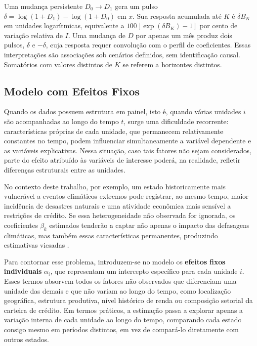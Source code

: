 Uma mudança persistente $D_0\to D_1$ gera um pulso $\delta=\log(1+D_1)-\log(1+D_0)$ em $x$. Sua resposta acumulada até $K$ é $\delta B_K$ em unidades logarítmicas, equivalente a $100[\exp(\delta B_K)-1]$ por cento de variação relativa de $I$. Uma mudança de $D$ por apenas um mês produz dois pulsos, $\delta$ e $-\delta$, cuja resposta requer convolução com o perfil de coeficientes. Essas interpretações são associações sob cenários definidos, sem identificação causal. Somatórios com valores distintos de $K$ se referem a horizontes distintos.

\subsection{Modelo com Efeitos Fixos}

Quando os dados possuem estrutura em painel, isto é, quando várias unidades $i$
são acompanhadas ao longo do tempo $t$, surge uma dificuldade recorrente:
características próprias de cada unidade, que permanecem relativamente constantes
no tempo, podem influenciar simultaneamente a variável dependente e as variáveis
explicativas. Nessa situação, caso tais fatores não sejam considerados, parte do
efeito atribuído às variáveis de interesse poderá, na realidade, refletir diferenças
estruturais entre as unidades.

No contexto deste trabalho, por exemplo, um estado historicamente mais vulnerável
a eventos climáticos extremos pode registrar, ao mesmo tempo, maior incidência de
desastres naturais e uma atividade econômica mais sensível a restrições de crédito.
Se essa heterogeneidade não observada for ignorada, os coeficientes $\beta_k$
estimados tenderão a captar não apenas o impacto das defasagens climáticas, mas
também essas características permanentes, produzindo estimativas viesadas
\citep{wooldridge2010}.

Para contornar esse problema, introduzem-se no modelo os \textbf{efeitos fixos
individuais} $\alpha_i$, que representam um intercepto específico para cada unidade
$i$. Esses termos absorvem todos os fatores não observados que diferenciam uma
unidade das demais e que não variam ao longo do tempo, como localização geográfica,
estrutura produtiva, nível histórico de renda ou composição setorial da carteira de
crédito. Em termos práticos, a estimação passa a explorar apenas a variação interna
de cada unidade ao longo do tempo, comparando cada estado consigo mesmo em períodos
distintos, em vez de compará-lo diretamente com outros estados.

